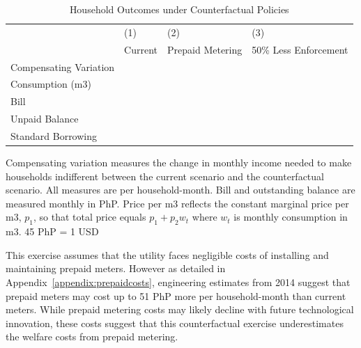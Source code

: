 \documentclass[12pt,table]{article}
\begin{document}
\begin{table}[H]
\centering
\caption{Household Outcomes under Counterfactual Policies}\label{table:counter}
\begin{threeparttable}
\begin{tabular}{@{}l*{1}{EEE}@{}}
\toprule
 & (1)    & (2)          & (3)   \\
 & Current & Prepaid Metering & 50\% Less Enforcement   \\
\midrule
Compensating Variation &   &   &   \\
Consumption (m3)	 &    &     &   \\
Bill			 &    &     &   \\
Unpaid Balance &  &     &    \\
Standard Borrowing &  &     &    \\
\bottomrule
\end{tabular}
\begin{tablenotes}
\item 
\footnotesize 
Compensating variation measures the change in monthly income needed to make households indifferent between the current scenario and the counterfactual scenario. All measures are per household-month.  Bill and outstanding balance are measured monthly in PhP.  Price per m3 reflects the constant marginal price per m3, $p_1$, so that total price equals $p_1+p_2 w_t$ where $w_t$ is monthly consumption in m3.  45 PhP = 1 USD
\end{tablenotes}
\end{threeparttable}
\end{table}


This exercise assumes that the utility faces negligible costs of installing and maintaining prepaid meters.  However as detailed in Appendix~\ref{appendix:prepaidcosts}, engineering estimates from 2014 suggest that prepaid meters may cost up to 51 PhP more per household-month than current meters.  While prepaid metering costs may likely decline with future technological innovation, these costs suggest that this counterfactual exercise underestimates the welfare costs from prepaid metering.    
\end{document}
